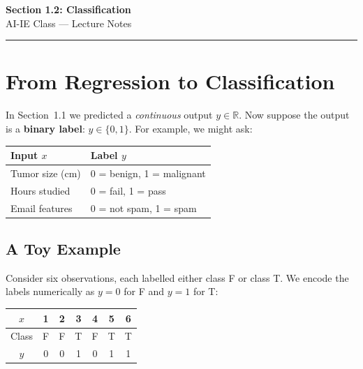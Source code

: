 \documentclass[12pt, a4paper]{article}
\begin{document}
\begin{center}
  {\LARGE \textbf{Section 1.2: Classification}} \\[0.5em]
  {\large AI-IE Class — Lecture Notes}%
  \ifstudentmode
  \fi
\end{center}

\vspace{1em}
\hrule
\vspace{1.5em}

\section{From Regression to Classification}

In Section~1.1 we predicted a \emph{continuous} output $y \in \mathbb{R}$.
Now suppose the output is a \textbf{binary label}: $y \in \{0, 1\}$.
For example, we might ask:

\begin{center}
  \renewcommand{\arraystretch}{1.2}
  \begin{tabular}{ll}
    \toprule
    \textbf{Input $x$} & \textbf{Label $y$}        \\
    \midrule
    Tumor size (cm)    & 0 = benign, 1 = malignant \\
    Hours studied      & 0 = fail, 1 = pass        \\
    Email features     & 0 = not spam, 1 = spam    \\
    \bottomrule
  \end{tabular}
\end{center}

\subsection{A Toy Example}

Consider six observations, each labelled either class F or class T.
We encode the labels numerically as $y = 0$ for F and $y = 1$ for T:

\begin{center}
  \renewcommand{\arraystretch}{1.2}
  \begin{tabular}{c|cccccc}
    \toprule
    $x$   & 1 & 2 & 3 & 4 & 5 & 6 \\
    \midrule
    Class & F & F & T & F & T & T \\
    $y$   & 0 & 0 & 1 & 0 & 1 & 1 \\
    \bottomrule
  \end{tabular}
\end{center}
\end{document}
